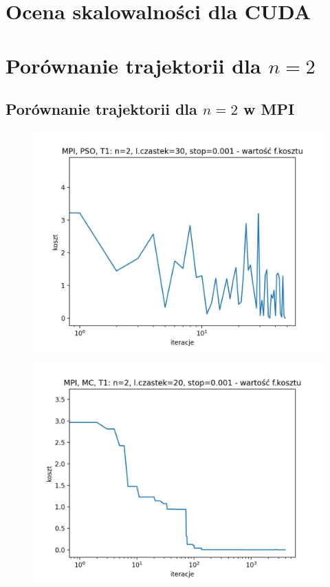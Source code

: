 \documentclass[11pt, a4paper, oneside]{article}
\begin{document}
\section{Ocena skalowalności dla CUDA}

\section{Porównanie trajektorii dla $n = 2$}

\subsection{Porównanie trajektorii dla $n = 2$ w MPI}

\begin{figure}[H]
\centering
\begin{minipage}[b]{\dimexpr.5\textwidth-1em}
  \centering
  \includegraphics[width=1\linewidth]{grafiki2/MPI_PSO_T1/MPI_PSO_T1_koszt.png}
  \label{fig:pozycjeStartowe:PSO1}
\end{minipage} \hfill
\begin{minipage}[b]{\dimexpr.5\textwidth-1em}
  \centering
  \includegraphics[width=1\linewidth]{grafiki2/MPI_MC_T1/MPI_MC_T1_koszt.png}

\end{minipage}
\end{figure}
\end{document}
